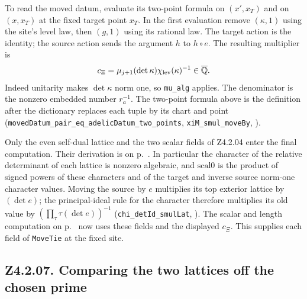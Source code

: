 To read the moved datum, evaluate its two-point formula on \((x',x_T)\)
and on \((x,x_T)\) at the fixed target point \(x_T\). In the first
evaluation remove \((\kappa,1)\) using the site's level law, then
\((g,1)\) using its rational law. The target action is the identity;
the source action sends the argument \(h\) to \(h\circ e\).
The resulting multiplier is
\[
 c_\Xi=\mu_{j+1}(\det\kappa)\chi_{\rm lev}(\kappa)^{-1}
       \in\overline{\mathbb Q}.
\]
Indeed unitarity makes \(\det\kappa\) norm one, so
\nolinkurl{mu_alg} applies. The denominator is the nonzero embedded
number \(r_a^{-1}\). The two-point formula above is the definition
after the dictionary replaces each tuple by its chart and point
(\nolinkurl{movedDatum_pair_eq_adelicDatum_two_points},
\nolinkurl{xiM_smul_moveBy},
).

Only the even self-dual lattice and the two scalar fields of
Z4.2.04 enter the final computation. Their derivation is on
p.~\pageref{r8:Z4.2.04}. In particular the character of the relative
determinant of each lattice is nonzero algebraic, and
\(\mathrm{scal0}\) is the product of signed powers of these characters
and of the target and inverse source norm-one character values.
Moving the source by \(e\) multiplies its top exterior lattice by
\((\det e)\); the principal-ideal rule for the character therefore
multiplies its old value by
\((\prod_\tau\tau(\det e))^{-1}\)
(\nolinkurl{chi_detId_smulLat},
).
The scalar and length computation on p.~\pageref{r7:Z4.2.06} now uses
these fields and the displayed \(c_\Xi\). This supplies each field of
\nolinkurl{MoveTie} at the fixed site.

\subsection{Z4.2.07. Comparing the two lattices off the chosen prime}\label{r8:Z4.2.07}

